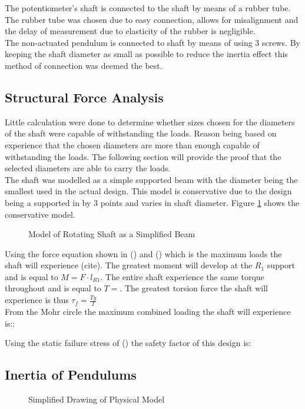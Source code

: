 The potentiometer's shaft is connected to the shaft by means of a rubber tube. The rubber tube was chosen due to easy connection, allows for misalignment and the delay of measurement due to elasticity of the rubber is negligible. \\

The non-actuated pendulum is connected to shaft by means of using 3 screws. By keeping the shaft diameter as small as possible to reduce the inertia effect this method of connection was deemed the best.

\subsection{Structural Force Analysis}
Little calculation were done to determine whether sizes chosen for the diameters of the shaft were capable of withstanding the loads. Reason being based on experience that the chosen diameters are more than enough capable of withstanding the loads. The following section will provide the proof that the selected diameters are able to carry the loads.\\

The shaft was modelled as a simple supported beam with the diameter being the smallest used in the actual design. This model is conservative due to the design being a supported in by 3 points and varies in shaft diameter. Figure \ref{fig:supp_beam} shows the conservative model.
\begin{figure}[h]
	\centering
	
	\caption{Model of Rotating Shaft as a Simplified Beam}
	\label{fig:supp_beam}
\end{figure}

Using the force equation shown in () and () which is the maximum loads the shaft will experience (cite). 
The greatest moment will develop at the $R_{1}$ support and is equal to $M = F\cdot l_{R1}$. The entire shaft experience the same torque throughout and is equal to $T = $. The greatest torsion force the shaft will experience is thus $\tau_{f} = \frac{Ty}{I}$\\

From the Mohr circle the maximum combined loading the shaft will experience is::

Using the static failure stress of () the safety factor of this design is: 

\subsection{Inertia of Pendulums}
\begin{figure}[h]
	\centering
	
	\caption{Simplified Drawing of Physical Model}
	\label{fig:model_drawing}
\end{figure}

